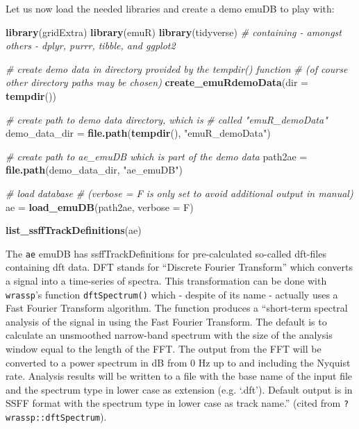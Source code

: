 \documentclass[]{book}
\newenvironment{Shaded}{\begin{snugshade}}{\end{snugshade}}
\newcommand{\CommentTok}[1]{\textcolor[rgb]{0.56,0.35,0.01}{\textit{#1}}}
\newcommand{\DataTypeTok}[1]{\textcolor[rgb]{0.13,0.29,0.53}{#1}}
\newcommand{\KeywordTok}[1]{\textcolor[rgb]{0.13,0.29,0.53}{\textbf{#1}}}
\newcommand{\NormalTok}[1]{#1}
\newcommand{\StringTok}[1]{\textcolor[rgb]{0.31,0.60,0.02}{#1}}
\begin{document}
Let us now load the needed libraries and create a demo emuDB to play with:

\begin{Shaded}
\begin{Highlighting}[]
\KeywordTok{library}\NormalTok{(gridExtra)}
\KeywordTok{library}\NormalTok{(emuR)}
\KeywordTok{library}\NormalTok{(tidyverse) }\CommentTok{# containing - amongst others - dplyr, purrr, tibble, and ggplot2}

\CommentTok{# create demo data in directory provided by the tempdir() function}
\CommentTok{# (of course other directory paths may be chosen)}
\KeywordTok{create_emuRdemoData}\NormalTok{(}\DataTypeTok{dir =} \KeywordTok{tempdir}\NormalTok{())}

\CommentTok{# create path to demo data directory, which is}
\CommentTok{# called "emuR_demoData"}
\NormalTok{demo_data_dir =}\StringTok{ }\KeywordTok{file.path}\NormalTok{(}\KeywordTok{tempdir}\NormalTok{(), }\StringTok{"emuR_demoData"}\NormalTok{)}

\CommentTok{# create path to ae_emuDB which is part of the demo data}
\NormalTok{path2ae =}\StringTok{ }\KeywordTok{file.path}\NormalTok{(demo_data_dir, }\StringTok{"ae_emuDB"}\NormalTok{)}

\CommentTok{# load database}
\CommentTok{# (verbose = F is only set to avoid additional output in manual)}
\NormalTok{ae =}\StringTok{ }\KeywordTok{load_emuDB}\NormalTok{(path2ae, }\DataTypeTok{verbose =}\NormalTok{ F)}

\KeywordTok{list_ssffTrackDefinitions}\NormalTok{(ae)}
\end{Highlighting}
\end{Shaded}

The \texttt{ae} emuDB has ssffTrackDefinitions for pre-calculated so-called dft-files containing dft data. DFT stands for ``Discrete Fourier Transform'' which converts a signal into a time-series of spectra. This transformation can be done with \texttt{wrassp}'s function \texttt{dftSpectrum()} which - despite of its name - actually uses a Fast Fourier Transform algorithm. The function produces a ``short-term spectral analysis of the signal in using the Fast Fourier Transform. The default is to calculate an unsmoothed narrow-band spectrum with the size of the analysis window equal to the length of the FFT. The output from the FFT will be converted to a power spectrum in dB from 0 Hz up to and including the Nyquist rate. Analysis results will be written to a file with the base name of the input file and the spectrum type in lower case as extension (e.g. `.dft'). Default output is in SSFF format with the spectrum type in lower case as track name.'' (cited from \texttt{?wrassp::dftSpectrum}).
\end{document}
